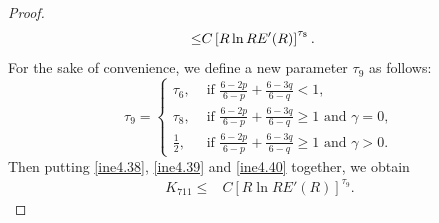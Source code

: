 \documentclass[11pt,reqno]{amsart}
\numberwithin{Thm}{section}
\begin{document}
\begin{proof}
\begin{align}
\leq&C\left[R\ln RE'(R)\right]^{\tau_8}.\notag
\end{align}
For the sake of convenience, we define a new parameter $\tau_9$ as follows:
\begin{equation*}
\tau_9=
\begin{cases}
\tau_6, & \text{ if  }\frac{6-2p}{6-p} + \frac{6-3q}{6-q} < 1, \\
\tau_8, & \text{ if  } \frac{6-2p}{6-p} + \frac{6-3q}{6-q}\geq1\text{ and }\gamma=0,\\
\frac{1}{2}, & \text{ if  } \frac{6-2p}{6-p} + \frac{6-3q}{6-q}\geq1\text{ and }\gamma>0.
\end{cases}
\end{equation*}
Then putting \eqref{ine4.38}, \eqref{ine4.39} and \eqref{ine4.40} together, we obtain
\begin{align}\label{ine4.41}
K_{711}\leq&C\left[R\ln RE'(R)\right]^{\tau_9}.
\end{align}



\end{proof}
\end{document}
